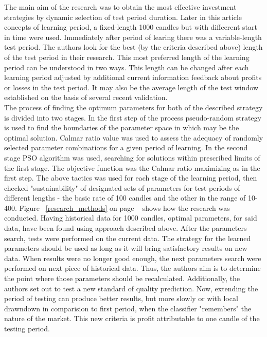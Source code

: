 \documentclass{tewiart}
\begin{document}
The main aim of the research was to obtain the most effective investment strategies by dynamic selection of test period duration. Later in this article concepts of learning period, a fixed-length 1000 candles but with diffeerent start in
time were used.  Immediately after period of learing there was a variable-length test period. The authors look for the best (by the criteria described above) length of the test period in their research. This most preferred length of the learning period can be understood in two ways. This length can be changed after each learning period adjusted by additional current information feedback about profits or losses in the test period. It may also be the average length of the test window established on the basis of several recent validation.\\

The process of finding the optimum parameters for both of the described strategy is divided into two stages. In the first step of the process pseudo-random strategy is used to find the boundaries of the parameter space in which may be the optimal solution. Calmar ratio value was used to assess the adequacy of randomly selected parameter combinations for a given period of learning. In the second stage PSO \cite{Kennedy}  algorithm was used, searching for solutions within prescribed limits of the first stage. The objective function was the Calmar ratio maximizing as in the first step. The above tactics was used for each stage of the learning period, then checked "sustainability" of designated sets of parameters for test periods of different lengths - the basic rate of 100 candles and the other in the range of 10-400.
Figure ~\ref{research_methods} on page ~\pageref{research_methods} shows how the research was conducted. Having historical data for 1000 candles, optimal parameters, for said data, have been found using approach described above. After the parameters search, tests were performed on the current data. The strategy for the learned parameters should be used as long as it will bring satisfactory results on new data. When results were no longer good enough, the next parameters search were performed on next piece of historical data. Thus, the authors aim is to determine the point where those parameters should be recalculated. Additionally, the authors set out to test a new standard of quality prediction. Now, extending the period of testing can produce better results, but more slowly or with local drawndown in comparision to first period, when the classifier "remembers" the nature of the market. This new criteria is profit attributable to one candle of the testing period.\\
\end{document}
